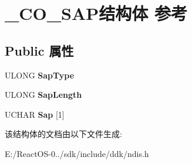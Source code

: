 \hypertarget{struct___c_o___s_a_p}{}\section{\+\_\+\+C\+O\+\_\+\+S\+A\+P结构体 参考}
\label{struct___c_o___s_a_p}
\subsection*{Public 属性}
\begin{DoxyCompactItemize}
\item 
\mbox{\label{struct___c_o___s_a_p_a1b0ee60539ea3f77557de5febce57520}} 
U\+L\+O\+NG {\bfseries Sap\+Type}
\item 
\mbox{\label{struct___c_o___s_a_p_a978de35806b321893359856eaf2250d2}} 
U\+L\+O\+NG {\bfseries Sap\+Length}
\item 
\mbox{\label{struct___c_o___s_a_p_aa962f1e1a05b8a5e409fd593b690f319}} 
U\+C\+H\+AR {\bfseries Sap} \mbox{[}1\mbox{]}
\end{DoxyCompactItemize}


该结构体的文档由以下文件生成\+:\begin{DoxyCompactItemize}
\item 
E\+:/\+React\+O\+S-\/0../sdk/include/ddk/ndis.\+h\end{DoxyCompactItemize}
